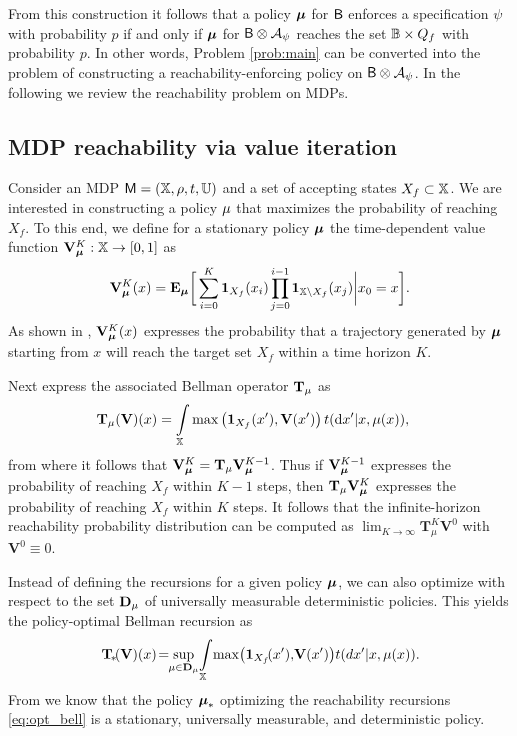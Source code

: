 \documentclass{ifacconf}
\newcommand{\ind}{\mathbf{1}}
\begin{document}
From this construction it follows that a policy ${\boldsymbol{\mu}}$ for $\mathsf{B}$ enforces a specification $\psi$ with probability $p$ if and only if ${\boldsymbol{\mu}}$ for $\mathsf{B} \otimes \mathcal{A}_\psi$ reaches the set $\mathbb{B} \times Q_f$ with probability $p$. In other words, Problem \ref{prob:main} can be converted into the problem of constructing a reachability-enforcing policy on $\mathsf{B} \otimes \mathcal{A}_\psi$. In the following we review the reachability problem on MDPs.

\subsection{MDP reachability via value iteration}

Consider an MDP $\mathsf{M} = ({\mathbb{X}}, \rho, t, {\mathbb{U}})$ and a set of accepting states $X_f \subset {\mathbb{X}}$. We are interested in constructing a policy ${\mu}$ that maximizes the probability of reaching $X_f$. To this end, we define for a stationary policy ${\boldsymbol{\mu}}$ the time-dependent value function $\mathbf V_{\boldsymbol{\mu}}^K:{\mathbb{X}}\rightarrow [0,1]$ as
\begin{equation}
\label{eq:Valfunc}
  \mathbf V^K_\polb(x)=\Ex_\polb \bigg[ \sum\limits_{ i=0 }^K \ind_{X_f}( x_i) \prod \limits_{\mathclap{j = 0}}^{i-1}\ind_{ \X \setminus X_f}( x_j ) \bigg| x_0 = x \bigg].
\end{equation}
As shown in \citep{Abate1}, $\mathbf V_{\boldsymbol{\mu}}^K (x)$ expresses the probability that a trajectory generated by ${\boldsymbol{\mu}}$ starting from $x$ will reach the target set $X_f$ within a time horizon $K$.

Next express the associated Bellman operator ${\mathbf {T}}_{\mu}$ as
\begin{align}
\label{eq:V_recopt}
  & \Bel_\pol (\mathbf  V)(x) = \int_\X \max \left( \mathbf 1_{X_f}( x'), \mathbf V(x') \right) {\tr}(\mathrm{d} x' | x,\pol( x)),
\end{align}
from where it follows that $\mathbf V_{\boldsymbol{\mu}}^{K} = {\mathbf {T}}_{\mu} \mathbf V_{\boldsymbol{\mu}}^{K-1}$. Thus if $\mathbf V_{\boldsymbol{\mu}}^{K-1} $ expresses the probability of reaching $X_f$ within $K-1$ steps, then $ {\mathbf {T}}_{\mu} \mathbf V_{\boldsymbol{\mu}}^{K} $ expresses the probability of reaching $X_f$ within $K$ steps. It follows that the infinite-horizon reachability probability distribution can be computed as $\lim_{K\rightarrow \infty}\mathbf T_\mu^{K} \mathbf V^0$ with $\mathbf{V}^0 \equiv 0$.

Instead of defining the recursions for a given policy ${\boldsymbol{\mu}}$, we can also optimize with respect to the set $\mathbf D_{{\mu}}$ of universally measurable deterministic policies. This yields the policy-optimal Bellman recursion as
\begin{equation}
  \Bel_{\!\ast} \!(\mathbf V)(x) \!=\!\!\sup_{\pol \in \mathbf D_{\pol}}\! \int_{\X}\! \max\! \left( \mathbf 1_{X_f}\!( x'),\! \mathbf V(x') \right)\! {\tr}(d  x' | x,\pol( x)).\!\label{eq:opt_bell}
\end{equation}
From \cite{Abate1} we know that the policy ${\boldsymbol{\mu}}_\ast$ optimizing  the reachability recursions \eqref{eq:opt_bell}  is a stationary, universally measurable, and deterministic policy.
\end{document}

